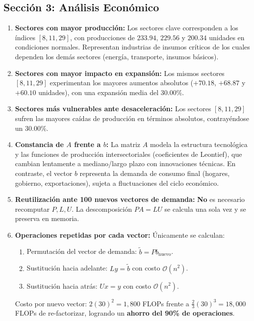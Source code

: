 \documentclass[11pt,a4paper]{article}
\theoremstyle{definition}
\theoremstyle{remark}
\begin{document}
\subsection{Sección 3: Análisis Económico}
\begin{enumerate}[leftmargin=*]
    \item \textbf{Sectores con mayor producción:} Los sectores clave corresponden a los índices $[8, 11, 29]$, con producciones de $233.94$, $229.56$ y $200.34$ unidades en condiciones normales. Representan industrias de insumos críticos de los cuales dependen los demás sectores (energía, transporte, insumos básicos).
    \item \textbf{Sectores con mayor impacto en expansión:} Los mismos sectores $[8, 11, 29]$ experimentan los mayores aumentos absolutos ($+70.18$, $+68.87$ y $+60.10$ unidades), con una expansión media del $30.00\%$.
    \item \textbf{Sectores más vulnerables ante desaceleración:} Los sectores $[8, 11, 29]$ sufren las mayores caídas de producción en términos absolutos, contrayéndose un $30.00\%$.
    \item \textbf{Constancia de $A$ frente a $b$:} La matriz $A$ modela la estructura tecnológica y las funciones de producción intersectoriales (coeficientes de Leontief), que cambian lentamente a mediano/largo plazo con innovaciones técnicas. En contraste, el vector $b$ representa la demanda de consumo final (hogares, gobierno, exportaciones), sujeta a fluctuaciones del ciclo económico.
    \item \textbf{Reutilización ante 100 nuevos vectores de demanda:} \textbf{No} es necesario recomputar $P, L, U$. La descomposición $PA = LU$ se calcula una sola vez y se preserva en memoria.
    \item \textbf{Operaciones repetidas por cada vector:} Únicamente se calculan:
    \begin{enumerate}
        \item Permutación del vector de demanda: $\tilde{b} = P b_{\text{nuevo}}$.
        \item Sustitución hacia adelante: $Ly = \tilde{b}$ con costo $\mathcal{O}(n^2)$.
        \item Sustitución hacia atrás: $Ux = y$ con costo $\mathcal{O}(n^2)$.
    \end{enumerate}
    Costo por nuevo vector: $2(30)^2 = 1{,}800$ FLOPs frente a $\frac{2}{3}(30)^3 = 18{,}000$ FLOPs de re-factorizar, logrando un \textbf{ahorro del 90\% de operaciones}.
\end{enumerate}
\end{document}
